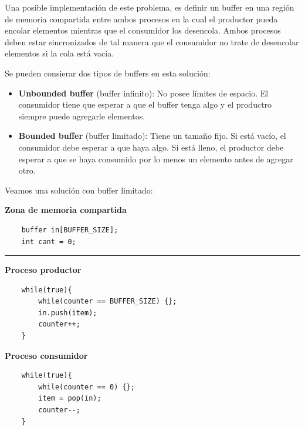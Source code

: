 Una posible implementación de este problema, es definir un buffer en una región de memoria compartida entre ambos procesos en la cual el productor pueda encolar elementos mientras que el consumidor los desencola. Ambos procesos deben estar sincronizados de tal manera que el consumidor no trate de desencolar elementos si la cola está vacía.

Se pueden consierar dos tipos de buffers en esta solución:
\begin{itemize}
	\item \textbf{Unbounded buffer} (buffer infinito): No posee límites de espacio. El consumidor tiene que esperar a que el buffer tenga algo y el productro siempre puede agregarle elementos.
	\item \textbf{Bounded buffer} (buffer limitado): Tiene un tamaño fijo. Si está vacío, el consumidor debe esperar a que haya algo. Si está lleno, el productor debe esperar a que se haya consumido por lo menos un elemento antes de agregar otro.
\end{itemize}

Veamos una solución con buffer limitado:

\vspace*{0.25cm}
\begin{center}
		\textbf{Zona de memoria compartida}
	\begin{verbatim}
	buffer in[BUFFER_SIZE];
	int cant = 0;
	\end{verbatim}
\end{center}
\setlength{\columnseprule}{0.4pt}
\noindent\rule{\textwidth}{0.4pt}
\begin{multicols}{2}
	\begin{center}
	\textbf{Proceso productor}

	\begin{verbatim}
	while(true){
		while(counter == BUFFER_SIZE) {};
		in.push(item);
		counter++;
	}
	\end{verbatim}
\columnbreak
\textbf{Proceso consumidor}
	\begin{verbatim}
	while(true){
		while(counter == 0) {};
		item = pop(in);
		counter--;
	}
	\end{verbatim}
	\end{center}
\end{multicols}
\setlength{\columnseprule}{0pt}

